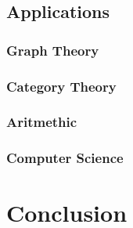 \documentclass{article}
\theoremstyle{plain}
\theoremstyle{definition}
\begin{document}
\subsection{Applications}
\subsubsection{Graph Theory}
\subsubsection{Category Theory}
\subsubsection{Aritmethic}
\subsubsection{Computer Science}
\section{Conclusion}
\end{document}
